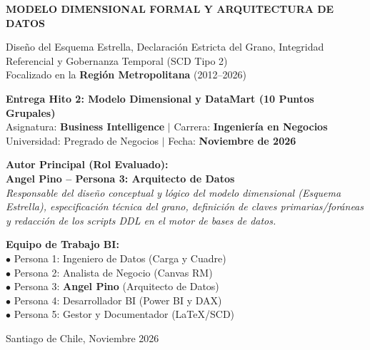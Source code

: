 \documentclass[11pt,a4paper]{article}
\begin{document}
\begin{titlepage}
    \centering
    \vspace*{0.8cm}
    {\Huge \bfseries \color{primaryblue} MODELO DIMENSIONAL FORMAL Y ARQUITECTURA DE DATOS\par}
    \vspace{0.4cm}
    {\LARGE \color{secondaryblue} Diseño del Esquema Estrella, Declaración Estricta del Grano, Integridad Referencial y Gobernanza Temporal (SCD Tipo 2)\\
    Focalizado en la \textbf{Región Metropolitana} (2012--2026)\par}
    \vspace{0.8cm}
    
    \begin{tcolorbox}[colback=lightbg, colframe=primaryblue, width=\textwidth, arc=3mm]
        \centering
        \large \textbf{Entrega Hito 2: Modelo Dimensional y DataMart (10 Puntos Grupales)}\\[2mm]
        \normalsize Asignatura: \textbf{Business Intelligence} $|$ Carrera: \textbf{Ingeniería en Negocios}\\[1mm]
        Universidad: Pregrado de Negocios $|$ Fecha: \textbf{Noviembre de 2026}
    \end{tcolorbox}
    
    \vspace{1.5cm}
    \begin{minipage}{0.48\textwidth}
        \textbf{Autor Principal (Rol Evaluado):}\\
        \textbf{\color{primaryblue}Angel Pino -- Persona 3: Arquitecto de Datos}\\
        \textit{Responsable del diseño conceptual y lógico del modelo dimensional (Esquema Estrella), especificación técnica del grano, definición de claves primarias/foráneas y redacción de los scripts DDL en el motor de bases de datos.}
    \end{minipage}
    \hfill
    \begin{minipage}{0.46\textwidth}
        \textbf{Equipo de Trabajo BI:}\\
        $\bullet$ Persona 1: Ingeniero de Datos (Carga y Cuadre)\\
        $\bullet$ Persona 2: Analista de Negocio (Canvas RM)\\
        $\bullet$ Persona 3: \textbf{Angel Pino} (Arquitecto de Datos)\\
        $\bullet$ Persona 4: Desarrollador BI (Power BI y DAX)\\
        $\bullet$ Persona 5: Gestor y Documentador (LaTeX/SCD)
    \end{minipage}

    \vfill
    {\small \color{darkgray} Santiago de Chile, Noviembre 2026}\par
\end{titlepage}
\end{document}
